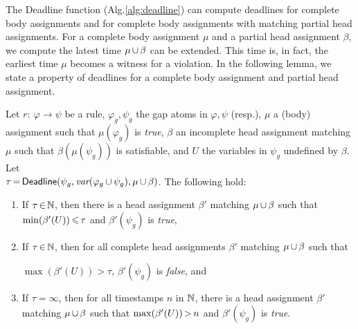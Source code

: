 \def\DDL{\textsf{Deadline}}

The {\DDL} function (Alg.\:\ref{alg:deadline})
can compute deadlines for complete body assignments
and for complete body assignments with matching partial head assignments.
For a complete body assignment $\mu$
and a partial head assignment $\beta$,
we compute the latest time $\mu\,{\cup}\,\beta$ can be extended.
This time is, in fact,
the earliest time $\mu$ becomes a witness for a violation.
In the following lemma,
we state a property of deadlines
for a complete body assignment
and partial head assignment.

\begin{lemma}\label{lemma:deadline}
  Let $r{:}\:\varphi{\rightarrow}\psi$ be a rule,
  $\varphi_g,\psi_g$ the gap atoms in $\varphi,\psi$ (resp.),
  $\mu$ a (body) assignment such that $\mu(\varphi_g)$ is {\sl true},
  $\beta$ an incomplete head assignment matching $\mu$
  such that $\beta(\mu(\psi_g))$ is satisfiable,
  and
  $U$ the variables in $\psi_g$ undefined by $\beta$.
  Let\\
  $\tau\,{=}\,{\sf Deadline}(\psi_g,\textit{var}(\varphi_g\,{\cup}\,\psi_g),\mu\,{\cup}\,\beta)$.
  The following hold:
  \begin{enumerate}
  \item If $\tau\,{\in}\,\mathbb{N}$,
    then there is a head assignment $\beta'$ matching
    $\mu\,{\cup}\,\beta$
    such that $\min(\beta'(U))\,{\leqslant}\,\tau$ and $\beta'(\psi_g)$ is
    {\sl true},
  \item If $\tau\,{\in}\,\mathbb{N}$,
    then for all complete head assignments $\beta'$ matching
    $\mu\,{\cup}\,\beta$
    such that

    $\max(\beta'(U)){>}\tau$, $\beta'(\psi_g)$
    is {\sl false}, and
  \item
    If $\tau=\infty$,
    then for all timestamps $n$ in $\mathbb{N}$,
    there is a head assignment $\beta'$ matching $\mu\,{\cup}\,\beta$
    such that $\max(\beta'(U))\,{>}\,n$ and $\beta'(\psi_g)$
    is {\sl true}. 
  \end{enumerate}
\end{lemma}

